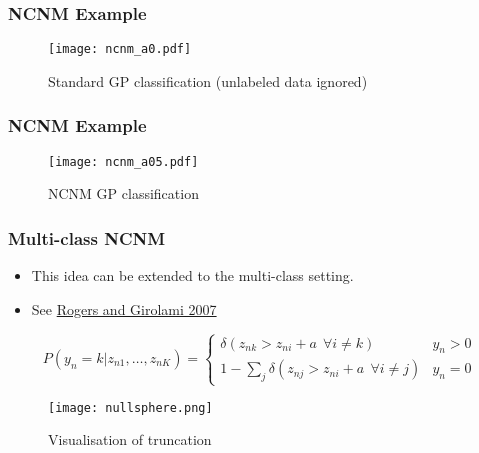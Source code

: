 \begin{frame}
	\frametitle{NCNM Example}
	\begin{figure}[tbh]
		\centering\texttt{[image: ncnm\_a0.pdf]}
		\centering\caption{\label{fig:ncnm_a0}Standard GP classification (unlabeled data ignored)}
	\end{figure}
\end{frame}

\begin{frame}
	\frametitle{NCNM Example}
	\begin{figure}[tbh]
		\centering\texttt{[image: ncnm\_a05.pdf]}
		\centering\caption{\label{fig:ncnm_a0.5}NCNM GP classification}
	\end{figure}
\end{frame}


\begin{frame}
	\frametitle{Multi-class \ac{NCNM}}
	\begin{itemize}
		\item This idea can be extended to the multi-class setting.
		\item See \href{http://jmlr.org/proceedings/papers/v1/rogers07a/rogers07a.pdf}{Rogers and Girolami 2007}
	\end{itemize}
		{\small \[
		P(y_n=k|z_{n1},\ldots,z_{nK}) = \left \{
				\begin{array}{cc}
					\delta(z_{nk} > z_{ni} + a~~\forall i \neq k) & y_n>0\\
					1 - \sum_j \delta(z_{nj} > z_{ni} + a ~~\forall i \neq j) & y_n=0
				\end{array}
			\right.
		\]}
		\begin{figure}[tbh]
			\centering\texttt{[image: nullsphere.png]}
			\centering\caption{\label{fig:nullsphere}Visualisation of truncation}
		\end{figure}
\end{frame}

